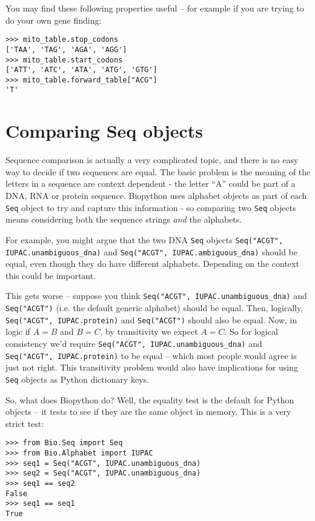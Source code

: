 \documentclass{report}
\begin{document}
You may find these following properties useful -- for example if you are trying
to do your own gene finding:
\begin{verbatim}
>>> mito_table.stop_codons
['TAA', 'TAG', 'AGA', 'AGG']
>>> mito_table.start_codons
['ATT', 'ATC', 'ATA', 'ATG', 'GTG']
>>> mito_table.forward_table["ACG"]
'T'
\end{verbatim}

\section{Comparing Seq objects}
\label{sec:seq-comparison}

Sequence comparison is actually a very complicated topic, and there is no easy
way to decide if two sequences are equal. The basic problem is the meaning of
the letters in a sequence are context dependent - the letter ``A'' could be part
of a DNA, RNA or protein sequence. Biopython uses alphabet objects as part of
each \verb|Seq| object to try and capture this information - so comparing two
\verb|Seq| objects means considering both the sequence strings \emph{and} the
alphabets.

For example, you might argue that the two DNA \verb|Seq| objects
\texttt{Seq("ACGT", IUPAC.unambiguous\_dna)} and
\texttt{Seq("ACGT", IUPAC.ambiguous\_dna)} should be equal, even though
they do have different alphabets. Depending on the context this could be
important.

This gets worse -- suppose you think \texttt{Seq("ACGT",
IUPAC.unambiguous\_dna)} and \texttt{Seq("ACGT")} (i.e. the default generic
alphabet) should be equal. Then, logically, \texttt{Seq("ACGT", IUPAC.protein)}
and \texttt{Seq("ACGT")} should also be equal. Now, in logic if $A=B$ and
$B=C$, by transitivity we expect $A=C$. So for logical consistency we'd
require \texttt{Seq("ACGT", IUPAC.unambiguous\_dna)} and \texttt{Seq("ACGT",
IUPAC.protein)} to be equal -- which most people would agree is just not right.
This transitivity problem would also have implications for using \verb|Seq|
objects as Python dictionary keys.

So, what does Biopython do? Well, the equality test is the default for Python
objects -- it tests to see if they are the same object in memory. This is a
very strict test:
\begin{verbatim}
>>> from Bio.Seq import Seq
>>> from Bio.Alphabet import IUPAC
>>> seq1 = Seq("ACGT", IUPAC.unambiguous_dna)
>>> seq2 = Seq("ACGT", IUPAC.unambiguous_dna)
>>> seq1 == seq2
False
>>> seq1 == seq1
True
\end{verbatim}
\end{document}
